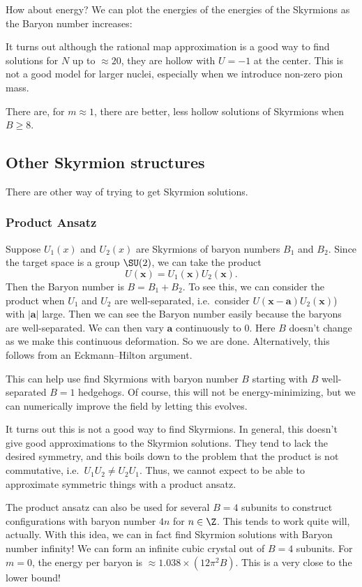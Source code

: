 \documentclass[a4paper]{article}
\begin{document}
How about energy? We can plot the energies of the energies of the Skyrmions as the Baryon number increases:


It turns out although the rational map approximation is a good way to find solutions for $N$ up to $\approx 20$, they are hollow with $U = -1$ at the center. This is not a good model for larger nuclei, especially when we introduce non-zero pion mass.

There are, for $m \approx 1$, there are better, less hollow solutions of Skyrmions when $B \geq 8$.

\subsection{Other Skyrmion structures}
There are other way of trying to get Skyrmion solutions.

\subsubsection*{Product Ansatz}
Suppose $U_1(x)$ and $U_2(x)$ are Skyrmions of baryon numbers $B_1$ and $B_2$. Since the target space is a group $\SU(2)$, we can take the product
\[
  U(\mathbf{x}) = U_1(\mathbf{x}) U_2(\mathbf{x}).
\]
Then the Baryon number is $B = B_1 + B_2$. To see this, we can consider the product when $U_1$ and $U_2$ are well-separated, i.e.\ consider $U(\mathbf{x} - \mathbf{a}) U_2(\mathbf{x})$) with $|\mathbf{a}|$ large. Then we can see the Baryon number easily because the baryons are well-separated. We can then vary $\mathbf{a}$ continuously to $0$. Here $B$ doesn't change as we make this continuous deformation. So we are done. Alternatively, this follows from an Eckmann--Hilton argument.

This can help use find Skyrmions with baryon number $B$ starting with $B$ well-separated $B = 1$ hedgehogs. Of course, this will not be energy-minimizing, but we can numerically improve the field by letting this evolves.

It turns out this is not a good way to find Skyrmions. In general, this doesn't give good approximations to the Skyrmion solutions. They tend to lack the desired symmetry, and this boils down to the problem that the product is not commutative, i.e.\ $U_1 U_2 \not= U_2 U_1$. Thus, we cannot expect to be able to approximate symmetric things with a product ansatz.

The product ansatz can also be used for several $B = 4$ subunits to construct configurations with baryon number $4n$ for $n \in \Z$. This tends to work quite will, actually. With this idea, we can in fact find Skyrmion solutions with Baryon number infinity! We can form an infinite cubic crystal out of $B = 4$ subunits. For $m = 0$, the energy per baryon is $\approx 1.038 \times (12 \pi^2 B)$. This is a very close to the lower bound!
\end{document}
